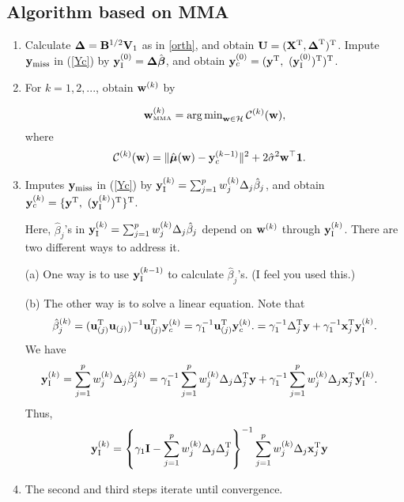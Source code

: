\documentclass[12pt,hidelinks]{article}
\begin{document}
\subsection{Algorithm based on MMA}
\begin{enumerate}
\item Calculate $\boldsymbol{\Delta}=\mathbf{B}^{1/2}\mathbf{V}_1$ as in \eqref{orth}, and obtain $\mathbf{U}=(\mathbf{X}^{\rm T},\boldsymbol{\Delta}^{\rm T})^{\rm T}$. Impute $\mathbf{y}_{\mathrm{miss}}$ in (\ref{Yc}) by
$\mathbf{y}_{\mathrm{I}}^{(0)} = \boldsymbol{\Delta}\hat{\boldsymbol{\beta}}$, and obtain $\mathbf{y}_c^{(0)}=(\mathbf{y}^{\rm T},\ (\mathbf{y}_{\mathrm{I}}^{(0)})^{\rm T})^{\rm T}$.

\item For $k=1, 2, ...$, obtain $\mathbf{w}^{(k)}$ by 

\begin{equation*}
  {\mathbf{w}}_{{\mbox{\tiny\rm MMA}}}^{(k)}= \mathop{\arg\min}\nolimits_{\mathbf{w} \in\mathcal{H}}{{\cal C}}^{(k)}(\mathbf{w}),
\end{equation*}
where 
\begin{align}\label{M-criterion}
  {\cal C}^{(k)}(\mathbf{w})
  &=\|\hat{\boldsymbol{\mu}}(\mathbf{w})-\mathbf{y}_c^{(k-1)}\|^2+2\hat{\sigma}^2 \mathbf{w}^{\top}\mathbf{1}.
\end{align}

\item Imputes $\mathbf{y}_{\mathrm{miss}}$ in (\ref{Yc}) by
  $\mathbf{y}_{\mathrm{I}}^{(k)}=\sum_{j=1}^p{w}^{(k)}_j\Delta_j\hat\beta_j$, and
  obtain $\mathbf{y}_c^{(k)}=\{\mathbf{y}^{\rm T},\ (\mathbf{y}_{\mathrm{I}}^{(k)})^{\rm T}\}^{\rm T}$.

{\red
Here, $\hat\beta_j$'s in
$\mathbf{y}_{\mathrm{I}}^{(k)}=\sum_{j=1}^p{w}^{(k)}_j\Delta_j\hat\beta_j$ depend on
${\mathbf{w}}^{(k)}$ through $\mathbf{y}_{\mathrm{I}}^{(k)}$. There are two different ways to
address it.

(a) One way is to use $\mathbf{y}_{\mathrm{I}}^{(k-1)}$ to calculate
$\hat\beta_j$'s. (I feel you used this.)

(b) The other way is to solve a linear
equation. Note that
\begin{equation}
  \hat\beta_j^{(k)}
  =(\mathbf{u}_{(j)}^{\rm T}\mathbf{u}_{(j)})^{-1}\mathbf{u}_{(j)}^{\rm T}\mathbf{y}_c^{(k)}
  =\gamma_1^{-1}\mathbf{u}_{(j)}^{\rm T}\mathbf{y}_c^{(k)}.
  =\gamma_1^{-1}\Delta_j^{\rm T}\mathbf{y}+\gamma_1^{-1}\mathbf{x}_j^{\rm T}\mathbf{y}_{\mathrm{I}}^{(k)}.
\end{equation}
We have
\begin{align}
  \mathbf{y}_{\mathrm{I}}^{(k)}
  &=\sum_{j=1}^p{w}^{(k)}_j\Delta_j\hat\beta_j^{(k)}
  =\gamma_1^{-1}\sum_{j=1}^p{w}^{(k)}_j\Delta_j\Delta_j^{\rm T}\mathbf{y}
    +\gamma_1^{-1}\sum_{j=1}^p{w}^{(k)}_j\Delta_j\mathbf{x}_j^{\rm T}\mathbf{y}_{\mathrm{I}}^{(k)}.
\end{align}
Thus,
\begin{align}
  \mathbf{y}_{\mathrm{I}}^{(k)}
  &=\left\{\gamma_1\mathbf{I}-\sum_{j=1}^p{w}^{(k)}_j
    \Delta_j\Delta_j^{\rm T}\right\}^{-1}
    \sum_{j=1}^p{w}^{(k)}_j\Delta_j\mathbf{x}_j^{\rm T}\mathbf{y}
\end{align}
}

\item The second and third steps iterate until convergence.
\end{enumerate}
\end{document}
